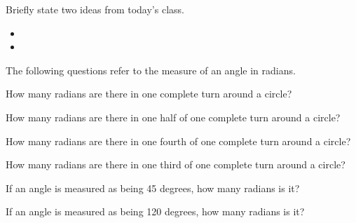 \begin{problem}
\item Briefly state two ideas from today's class.
  \begin{itemize}
  \item
  \item
  \end{itemize}
\item The following questions refer to the measure of an angle in
  radians.
  \begin{subproblem}
  \item How many radians are there in one complete turn around a
    circle?
    \vfill
  \item How many radians are there in one half of one complete turn
    around a circle?
    \vfill
  \item How many radians are there in one fourth of one complete turn
    around a circle?
    \vfill
  \item How many radians are there in one third  of one complete turn
    around a circle?
    \vfill
  \item If an angle is measured as being 45 degrees, how many radians
    is it?
    \vfill
  \item If an angle is measured as being 120 degrees, how many radians
    is it?
    \vfill
  \end{subproblem}
\end{problem}


